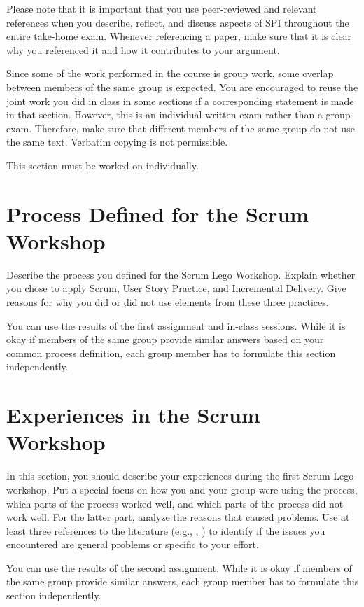 \documentclass[conference]{IEEEtran}
\begin{document}
Please note that it is important that you use peer-reviewed and relevant references when you describe, reflect, and discuss aspects of SPI throughout the entire take-home exam. Whenever referencing a paper, make sure that it is clear why you referenced it and how it contributes to your argument.

Since some of the work performed in the course is group work, some overlap between members of the same group is expected. You are encouraged to reuse the joint work you did in class in some sections if a corresponding statement is made in that section. However, this is an individual written exam rather than a group exam. Therefore, make sure that different members of the same group do not use the same text. Verbatim copying is not permissible.

This section must be worked on individually.

\section{Process Defined for the Scrum Workshop}
\label{sec:process}
Describe the process you defined for the Scrum Lego Workshop. Explain whether you chose to apply Scrum, User Story Practice, and Incremental Delivery. Give reasons for why you did or did not use elements from these three practices.

You can use the results of the first assignment and in-class sessions. While it is okay if members of the same group provide similar answers based on your common process definition, each group member has to formulate this section independently.

\section{Experiences in the Scrum Workshop}
\label{sec:experiences}
In this section, you should describe your experiences during the first Scrum Lego workshop. Put a special focus on how you and your group were using the process, which parts of the process worked well, and which parts of the process did not work well. For the latter part, analyze the reasons that caused problems. Use at least three references to the literature (e.g., \cite{CaterSteel2006}, \cite{Abrahamsson2002}) to identify if the issues you encountered are general problems or specific to your effort.

You can use the results of the second assignment. While it is okay if members of the same group provide similar answers, each group member has to formulate this section independently.
\end{document}
